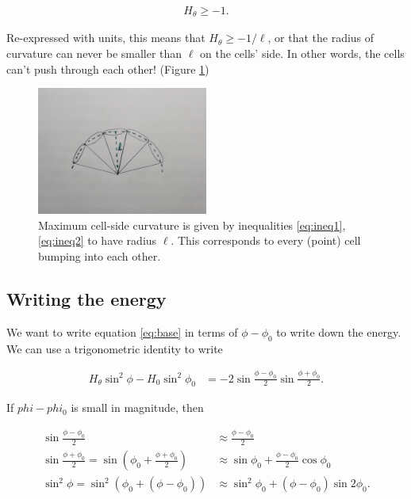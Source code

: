\documentclass[draft]{article}
\begin{document}
\begin{align}
    H_\theta \geq -1. \label{eq:hlb}
\end{align}

\noindent Re-expressed with units, this means that $H_\theta \geq -1/\ell$, or that the radius of curvature can never be smaller than $\ell$ on the cells' side. In other words, the cells can't push through each other! (Figure \ref{fig:maxcurv})

\begin{figure}[hbtp]
    \centering
    \includegraphics[width=0.5\textwidth]{figures/arc.jpg}
    \caption{Maximum cell-side curvature is given by inequalities \ref{eq:ineq1}, \ref{eq:ineq2} to have radius $\ell$. This corresponds to every (point) cell bumping into each other.}
    \label{fig:maxcurv}
\end{figure}

\subsection{Writing the energy}

We want to write equation \ref{eq:base} in terms of $\phi-\phi_0$ to write down the energy. We can use a trigonometric identity to write

\begin{align}
    H_\theta \sin^2\phi - H_0 \sin^2\phi_0 &= -2 \sin \frac{\phi - \phi_0}{2} \sin\frac{\phi + \phi_0}{2}. \label{eq:preapprox}
\end{align}

\noindent If $phi - phi_0$ is small in magnitude, then 

\begin{align*}
    \sin\frac{\phi - \phi_0}{2} &\approx \frac{\phi - \phi_0}{2} \\
    \sin\frac{\phi + \phi_0}{2} = \sin\left(\phi_0 + \frac{\phi + \phi_0}{2} \right) &\approx \sin\phi_0 + \frac{\phi - \phi_0}{2} \cos\phi_0 \\
    \sin^2\phi = \sin^2\left(\phi_0 + (\phi - \phi_0) \right) &\approx \sin^2\phi_0 +(\phi - \phi_0)\sin2\phi_0.
\end{align*}
\end{document}
